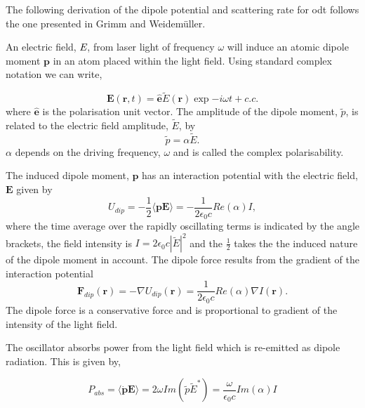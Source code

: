 The following derivation of the dipole potential and scattering rate for \gls{odt} follows the one presented in Grimm and Weidem\"uller\cite{grimm_optical_2000}.

An electric field, $\emph{E}$, from laser light of frequency $\omega$ will induce an atomic dipole moment $\boldsymbol{p}$ in an atom placed within the light field. Using standard complex notation we can write,

\begin{equation}\label{eq:efield}
\boldsymbol E (\boldsymbol r ,t)=\hat{\boldsymbol e} \tilde E (\boldsymbol r) \exp{-i\omega t + c.c.}
\end{equation}
where $\hat{\boldsymbol{e}}$ is the polarisation unit vector. The amplitude of the dipole moment, $\tilde p$, is related to the electric field amplitude, $\tilde E$, by
\begin{equation}\label{eq:polarisability}
\tilde p = \alpha \tilde E.
\end{equation}
$\alpha$ depends on the driving frequency, $\omega$ and is called the complex polarisability.

The induced dipole moment, $\boldsymbol p$ has an interaction potential with the electric field, $\boldsymbol E$ given by
\begin{equation}\label{eq:interaction_pot}
U_{dip} = - \frac{1}{2} \langle \boldsymbol{pE} \rangle = - \frac{1}{2 \epsilon_0 c} Re(\alpha)I,
\end{equation}
where the time average over the rapidly oscillating terms is indicated by the angle brackets, the field intensity is $I=2\epsilon_0 c |\tilde E|^2$ and the $\frac{1}{2}$ takes the the induced nature of the dipole moment in account. The dipole force results from the gradient of the interaction potential
\begin{equation}\label{eq:dipole_force}
\boldsymbol F_{dip}(\boldsymbol r ) = - \nabla U_{dip}(\boldsymbol r) = \frac{1}{2 \epsilon_0 c} Re(\alpha) \nabla I(\boldsymbol r).
\end{equation}
The dipole force is a conservative force and is proportional to gradient of the intensity of the light field.

The oscillator absorbs power from the light field which is re-emitted as dipole radiation. This is given by,

\begin{equation}\label{eq:power_absorbed}
P_{abs} = \langle \boldsymbol{\dot p E} \rangle = 2 \omega Im(\tilde p \tilde E^*) = \frac{\omega}{\epsilon_0 c} Im (\alpha) I
\end{equation}

